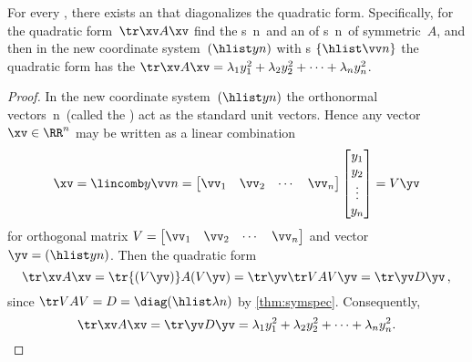\begin{theorem} \label{thm:patqform}
For every , there exists an   that diagonalizes the quadratic form.
Specifically, for the quadratic form~\(\tr\xv A\xv\) find the 
s~\hlist\lambda n\ and an  of s~\hlist\vv n\ of symmetric~\(A\), and then in the new coordinate system~\((\hlist yn)\) with s \(\{\hlist\vv n\}\) the quadratic form has the  \(\tr\xv A\xv=\lambda_1y_1^2+\lambda_2y_2^2+\cdots+\lambda_ny_n^2\).
\end{theorem}

\begin{proof} 
In the new coordinate system~\((\hlist yn)\) the orthonormal vectors~\hlist\vv n\ (called the ) act as the standard unit vectors.
Hence any vector \(\xv\in\RR^n\) may be written as a linear combination
\begin{equation*}
\xv=\lincomb y\vv n
=\begin{bmatrix} \vv_1&\vv_2&\cdots&\vv_n \end{bmatrix}\begin{bmatrix} y_1\\y_2\\\vdots\\y_n \end{bmatrix}
=V\yv
\end{equation*}
for orthogonal matrix \(V=\begin{bmatrix} \vv_1&\vv_2&\cdots&\vv_n \end{bmatrix}\) and vector \(\yv=(\hlist yn)\).
Then the quadratic form 
\begin{equation*}
\tr\xv A\xv=\tr{(V\yv)} A(V\yv)=\tr\yv \tr VAV\yv=\tr\yv D\yv\,,
\end{equation*}
since \(\tr VAV=D=\diag(\hlist\lambda n)\) by \autoref{thm:symspec}.
Consequently,
\begin{equation*}
\tr\xv A\xv=\tr\yv D\yv=\lambda_1y_1^2+\lambda_2y_2^2+\cdots+\lambda_ny_n^2.
\end{equation*}
\end{proof}



\begin{comment}
Maybe applications to moment of inertia? and the rotating lunch box?
extreme stresses in a solid?
Could link to SVD and extreme values of length \(|A\xv|\): but where is it best established?
\end{comment}





